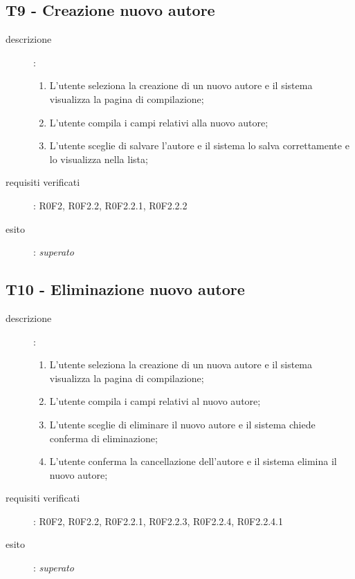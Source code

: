 \subsection{T9 - Creazione nuovo autore}
\begin{description}
\item[descrizione]: \hfill
	\begin{enumerate}
	\item L'utente seleziona la creazione di un nuovo autore e il sistema visualizza la pagina di compilazione;
	\item L'utente compila i campi relativi alla nuovo autore;
	\item L'utente sceglie di salvare l'autore e il sistema lo salva correttamente e lo visualizza nella lista;
	\end{enumerate}
\item[requisiti verificati]: R0F2, R0F2.2, R0F2.2.1, R0F2.2.2
\item[esito]: \emph{superato}
\end{description}

\subsection{T10 - Eliminazione nuovo autore}
\begin{description}
\item[descrizione]: \hfill
	\begin{enumerate}
	\item L'utente seleziona la creazione di un nuova autore e il sistema visualizza la pagina di compilazione;
	\item L'utente compila i campi relativi al nuovo autore;
	\item L'utente sceglie di eliminare il nuovo autore e il sistema chiede conferma di eliminazione;
	\item L'utente conferma la cancellazione dell'autore e il sistema elimina il nuovo autore;
	\end{enumerate}
\item[requisiti verificati]: R0F2, R0F2.2, R0F2.2.1, R0F2.2.3, R0F2.2.4, R0F2.2.4.1
\item[esito]: \emph{superato}
\end{description}

